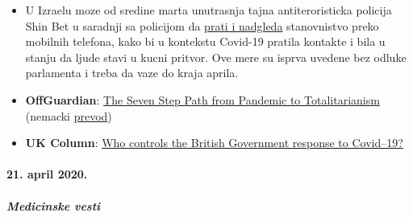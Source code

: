 \begin{itemize}
{  ljudi} nego sam virus.
\item
  U Izraelu moze od sredine marta unutrasnja tajna antiteroristicka
  policija Shin Bet u saradnji sa policijom da
  \href{https://www.jewishpress.com/news/the-courts/state-to-high-court-even-more-shin-bet-involvement-in-fighting-the-coronavirus/2020/04/14/}{prati
  i nadgleda} stanovnistvo preko mobilnih telefona, kako bi u kontekstu
  Covid-19 pratila kontakte i bila u stanju da ljude stavi u kucni
  pritvor. Ove mere su isprva uvedene bez odluke parlamenta i treba da
  vaze do kraja aprila.
\item
  \textbf{OffGuardian}:
  \href{https://off-guardian.org/2020/04/23/the-seven-step-path-from-pandemic-to-totalitarianism/}{The
  Seven Step Path from Pandemic to Totalitarianism} (nemacki
  \href{https://uncut-news.ch/wp-content/uploads/2020/04/In-sieben-Schritte-von-der-Pandemie-zum-Totalitarismus.pdf}{prevod})
\item
  \textbf{UK Column}:
  \href{https://www.ukcolumn.org/article/who-controls-british-government-response-covid19-part-one}{Who
  controls the British Government response to Covid--19?}
\end{itemize}

\hypertarget{21-april-2020}{%
\paragraph{21. april 2020.}\label{21-april-2020}}

\hypertarget{medicinske-vesti-1}{%
\subparagraph{\texorpdfstring{\textbf{Medicinske
vesti}}{Medicinske vesti}}\label{medicinske-vesti-1}}

